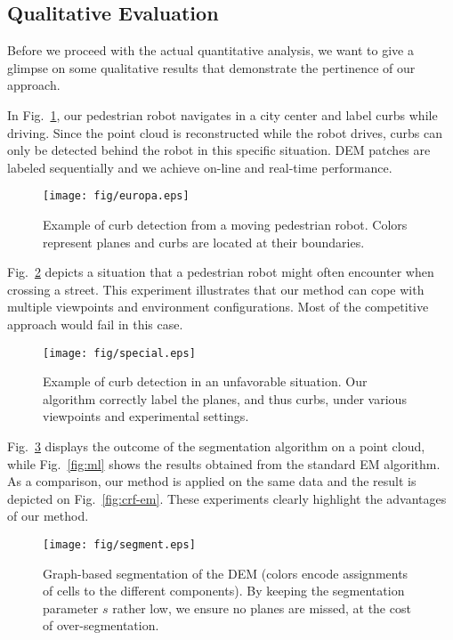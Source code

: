 \subsection{Qualitative Evaluation}
Before we proceed with the actual quantitative analysis, we want to give a
glimpse on some qualitative results that demonstrate the pertinence of our
approach.

In Fig.~\ref{fig:europa}, our pedestrian robot navigates in a city center and
label curbs while driving. Since the point cloud is reconstructed while the
robot drives, curbs can only be detected behind the robot in this specific
situation. DEM patches are labeled sequentially and we achieve on-line and
real-time performance.

\begin{figure}[t]
\centering
\texttt{[image: fig/europa.eps]}
\caption{Example of curb detection from a moving pedestrian robot. Colors
represent planes and curbs are located at their boundaries.}
\label{fig:europa}
\end{figure}

Fig.~\ref{fig:special} depicts a situation that a pedestrian robot might often
encounter when crossing a street. This experiment illustrates that our method
can cope with multiple viewpoints and environment configurations. Most of the
competitive approach would fail in this case.

\begin{figure}[t]
\centering
\texttt{[image: fig/special.eps]}
\caption{Example of curb detection in an unfavorable situation. Our algorithm
correctly label the planes, and thus curbs, under various viewpoints and
experimental settings.}
\label{fig:special}
\end{figure}

Fig.~\ref{fig:segment} displays the outcome of the segmentation algorithm on a
point cloud, while Fig.~\ref{fig:ml} shows the results obtained from the
standard EM algorithm. As a comparison, our method is applied on the same data
and the result is depicted on Fig.~\ref{fig:crf-em}. These experiments clearly
highlight the advantages of our method.

\begin{figure}[t]
\centering
\texttt{[image: fig/segment.eps]}
\caption{Graph-based segmentation of the DEM (colors encode assignments of
cells to the different components). By keeping the segmentation parameter $s$
rather low, we ensure no planes are missed, at the cost of over-segmentation.}
\label{fig:segment}
\end{figure}

